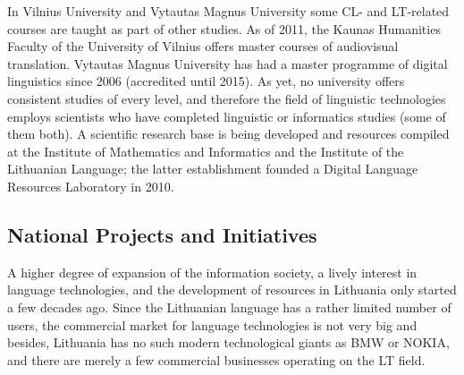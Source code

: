 \begin{multicols}{2}
    In Vilnius University and Vytautas Magnus University some CL- and LT-related courses are taught as part of other studies. As of 2011, the Kaunas Humanities Faculty of the University of Vilnius offers master courses of audiovisual translation. Vytautas Magnus University has had a master programme of digital linguistics  since 2006 (accredited until 2015). As yet, no university offers consistent studies of every level, and therefore the field of linguistic technologies employs scientists who have completed linguistic or informatics studies (some of them both). A scientific research base is being developed and resources compiled at the Institute of Mathematics and Informatics and the Institute of the Lithuanian Language; the latter establishment founded a Digital Language Resources Laboratory in 2010.

\subsection{National Projects and Initiatives}

A higher degree of expansion of the information society, a lively interest in language technologies, and the development of resources in Lithuania only started a few decades ago. Since the Lithuanian language has a rather limited number of users, the commercial market for language technologies is not very big and besides, Lithuania has no such modern technological giants as BMW or NOKIA, and there are merely a few commercial businesses operating on the LT field.  


\end{multicols}
